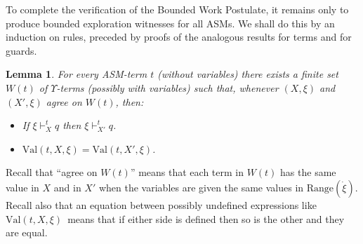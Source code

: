 \documentclass{LMCS}
\newtheorem{la}[thm]{Lemma}
\theoremstyle{definition}
\newenvironment{ls}{\begin{itemize}}{\end{itemize}}
\newcommand{\U}{\Upsilon}
\newcommand{\ans}{\dot}
\newcommand{\ran}[1]{\ensuremath{{\text{Range}}(#1)}}
\newcommand{\val}[3]{\ensuremath{\text{Val}(#1,#2,#3)}}
\begin{document}
To complete the verification of the Bounded Work Postulate, it remains
only to produce bounded exploration witnesses for all ASMs.  We shall
do this by an induction on rules, preceded by proofs of the analogous
results for terms and for guards.

\begin{la}
For every ASM-term $t$ (without variables) there exists a finite set
$W(t)$ of $\U$-terms (possibly with variables) such that,
whenever $(X,\xi)$ and $(X',\xi)$ agree on $W(t)$, then:
\begin{ls}
  \item If $\xi\vdash^t_Xq$ then $\xi\vdash^t_{X'}q$.
  \item $\val tX\xi=\val t{X'}\xi$.
\end{ls}
\end{la}

Recall that ``agree on $W(t)$'' means that each term in $W(t)$ has the
same value in  $X$ and in $X'$ when the variables are given the same
values in \ran{\ans\xi}.  Recall also that an equation between
possibly undefined expressions like \val tX\xi\ means that if either
side is defined then so is the other and they are equal.
\end{document}
